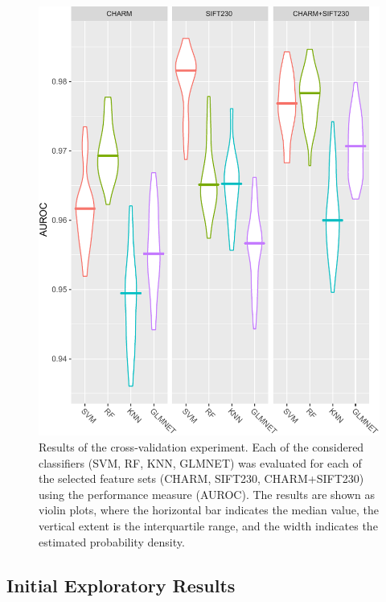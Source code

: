 \begin{figure}
	\centering
	\includegraphics[width=\columnwidth]{fig05}
	\caption{Results of the cross-validation experiment. Each of the considered classifiers (SVM, RF, KNN, GLMNET) was evaluated for each of the selected feature sets (CHARM, SIFT230, CHARM+SIFT230) using the performance measure (AUROC). The results are shown as violin plots, where the horizontal bar indicates the median value, the vertical extent is the interquartile range, and the width indicates the estimated probability density.}
	\label{fig:fullCVresults}
\end{figure}

\subsection{Initial Exploratory Results}
\label{subsec:initialExploratoryExperiments}

